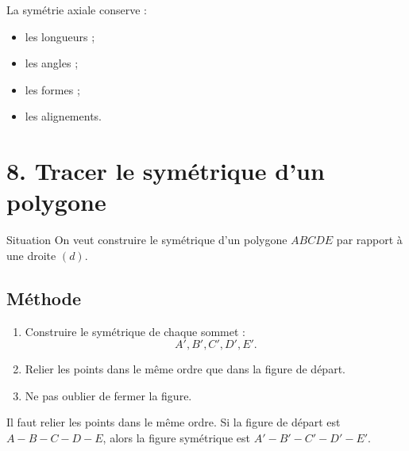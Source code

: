 \documentclass[11pt,a4paper]{article}
\begin{document}
\begin{retenir}
La symétrie axiale conserve :
\begin{itemize}[label=\textbullet]
    \item les longueurs ;
    \item les angles ;
    \item les formes ;
    \item les alignements.
\end{itemize}
\end{retenir}

\section*{8. Tracer le symétrique d'un polygone}

\begin{boite}{Situation}
On veut construire le symétrique d'un polygone $ABCDE$ par rapport à une droite $(d)$.
\end{boite}

\subsection*{Méthode}

\begin{enumerate}[label=\textbf{Étape \arabic* :}]
    \item Construire le symétrique de chaque sommet :
    \[
    A',B',C',D',E'.
    \]
    \item Relier les points dans le même ordre que dans la figure de départ.
    \item Ne pas oublier de fermer la figure.
\end{enumerate}

\begin{attention}
Il faut relier les points dans le même ordre.  
Si la figure de départ est $A-B-C-D-E$, alors la figure symétrique est $A'-B'-C'-D'-E'$.
\end{attention}
\end{document}
